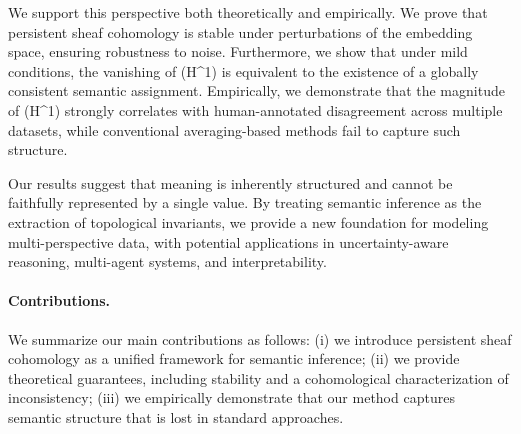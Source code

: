 We support this perspective both theoretically and empirically. We prove that persistent sheaf cohomology is stable under perturbations of the embedding space, ensuring robustness to noise. Furthermore, we show that under mild conditions, the vanishing of (H^1) is equivalent to the existence of a globally consistent semantic assignment. Empirically, we demonstrate that the magnitude of (H^1) strongly correlates with human-annotated disagreement across multiple datasets, while conventional averaging-based methods fail to capture such structure.

Our results suggest that meaning is inherently structured and cannot be faithfully represented by a single value. By treating semantic inference as the extraction of topological invariants, we provide a new foundation for modeling multi-perspective data, with potential applications in uncertainty-aware reasoning, multi-agent systems, and interpretability.

\paragraph{Contributions.}
We summarize our main contributions as follows:
(i) we introduce persistent sheaf cohomology as a unified framework for semantic inference;
(ii) we provide theoretical guarantees, including stability and a cohomological characterization of inconsistency;
(iii) we empirically demonstrate that our method captures semantic structure that is lost in standard approaches.

